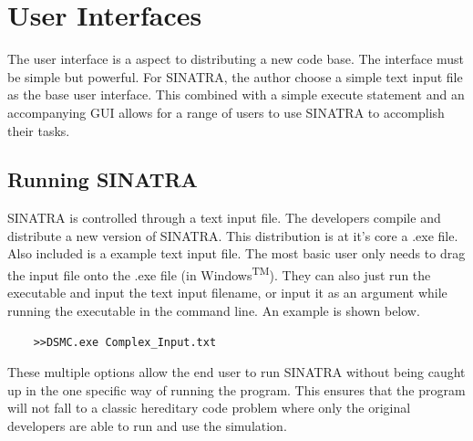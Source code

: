 \section{User Interfaces}
The user interface is a aspect to distributing a new code base. The interface must be simple but powerful. For SINATRA, the author choose a simple text input file as the base user interface. This combined with a simple execute statement and an accompanying GUI allows for a range of users to use SINATRA to accomplish their tasks. 
\subsection{Running SINATRA}
SINATRA is controlled through a text input file. The developers compile and distribute a new version of SINATRA. This distribution is at it's core a .exe file. Also included is a example text input file. The most basic user only needs to drag the input file onto the .exe file (in Windows\textsuperscript{TM}). They can also just run the executable and input the text input filename, or input it as an argument while running the executable in the command line. An example is shown below.
\begin{verbatim}
    >>DSMC.exe Complex_Input.txt
\end{verbatim}
\indent These multiple options allow the end user to run SINATRA without being caught up in the one specific way of running the program. This ensures that the program will not fall to a classic hereditary code problem where only the original developers are able to run and use the simulation.

